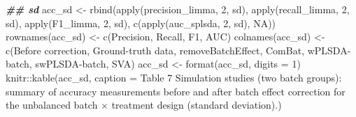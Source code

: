 \documentclass[
]{book}
\newenvironment{Shaded}{\begin{snugshade}}{\end{snugshade}}
\newcommand{\AttributeTok}[1]{\textcolor[rgb]{0.77,0.63,0.00}{#1}}
\newcommand{\ConstantTok}[1]{\textcolor[rgb]{0.00,0.00,0.00}{#1}}
\newcommand{\DecValTok}[1]{\textcolor[rgb]{0.00,0.00,0.81}{#1}}
\newcommand{\DocumentationTok}[1]{\textcolor[rgb]{0.56,0.35,0.01}{\textbf{\textit{#1}}}}
\newcommand{\FunctionTok}[1]{\textcolor[rgb]{0.00,0.00,0.00}{#1}}
\newcommand{\NormalTok}[1]{#1}
\newcommand{\OtherTok}[1]{\textcolor[rgb]{0.56,0.35,0.01}{#1}}
\newcommand{\SpecialCharTok}[1]{\textcolor[rgb]{0.00,0.00,0.00}{#1}}
\newcommand{\StringTok}[1]{\textcolor[rgb]{0.31,0.60,0.02}{#1}}
\begin{document}
\begin{Shaded}
\begin{Highlighting}[]
\DocumentationTok{\#\# sd}
\NormalTok{acc\_sd }\OtherTok{\textless{}{-}} \FunctionTok{rbind}\NormalTok{(}\FunctionTok{apply}\NormalTok{(precision\_limma, }\DecValTok{2}\NormalTok{, sd), }\FunctionTok{apply}\NormalTok{(recall\_limma, }\DecValTok{2}\NormalTok{, sd), }
                \FunctionTok{apply}\NormalTok{(F1\_limma, }\DecValTok{2}\NormalTok{, sd), }\FunctionTok{c}\NormalTok{(}\FunctionTok{apply}\NormalTok{(auc\_splsda, }\DecValTok{2}\NormalTok{, sd), }\ConstantTok{NA}\NormalTok{))}
\FunctionTok{rownames}\NormalTok{(acc\_sd) }\OtherTok{\textless{}{-}} \FunctionTok{c}\NormalTok{(}\StringTok{\textquotesingle{}Precision\textquotesingle{}}\NormalTok{, }\StringTok{\textquotesingle{}Recall\textquotesingle{}}\NormalTok{, }\StringTok{\textquotesingle{}F1\textquotesingle{}}\NormalTok{, }\StringTok{\textquotesingle{}AUC\textquotesingle{}}\NormalTok{)}
\FunctionTok{colnames}\NormalTok{(acc\_sd) }\OtherTok{\textless{}{-}} \FunctionTok{c}\NormalTok{(}\StringTok{\textquotesingle{}Before correction\textquotesingle{}}\NormalTok{, }\StringTok{\textquotesingle{}Ground{-}truth data\textquotesingle{}}\NormalTok{, }
                      \StringTok{\textquotesingle{}removeBatchEffect\textquotesingle{}}\NormalTok{, }\StringTok{\textquotesingle{}ComBat\textquotesingle{}}\NormalTok{, }
                      \StringTok{\textquotesingle{}wPLSDA{-}batch\textquotesingle{}}\NormalTok{, }\StringTok{\textquotesingle{}swPLSDA{-}batch\textquotesingle{}}\NormalTok{, }\StringTok{\textquotesingle{}SVA\textquotesingle{}}\NormalTok{)}
\NormalTok{acc\_sd }\OtherTok{\textless{}{-}} \FunctionTok{format}\NormalTok{(acc\_sd, }\AttributeTok{digits =} \DecValTok{1}\NormalTok{)}
\NormalTok{knitr}\SpecialCharTok{::}\FunctionTok{kable}\NormalTok{(acc\_sd, }\AttributeTok{caption =} \StringTok{\textquotesingle{}Table 7 Simulation studies (two batch groups): summary of accuracy measurements before and after batch effect correction for the unbalanced batch × treatment design (standard deviation).\textquotesingle{}}\NormalTok{)}
\end{Highlighting}
\end{Shaded}
\end{document}
